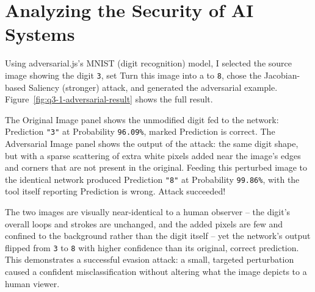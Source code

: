 \section{Analyzing the Security of AI Systems}


\dranswer

Using adversarial.js's MNIST (digit recognition) model, I selected the source image showing the digit \texttt{3}, set \textquotedbl{}Turn this image into a\textquotedbl{} to \texttt{8}, chose the \textquotedbl{}Jacobian-based Saliency (stronger)\textquotedbl{} attack, and generated the adversarial example. Figure~\ref{fig:q3-1-adversarial-result} shows the full result.

The Original Image panel shows the unmodified digit fed to the network: Prediction \texttt{"3"} at Probability \texttt{96.09\%}, marked \textquotedbl{}Prediction is correct.\textquotedbl{} The Adversarial Image panel shows the output of the attack: the same digit shape, but with a sparse scattering of extra white pixels added near the image's edges and corners that are not present in the original. Feeding this perturbed image to the identical network produced Prediction \texttt{"8"} at Probability \texttt{99.86\%}, with the tool itself reporting \textquotedbl{}Prediction is wrong. Attack succeeded!\textquotedbl{}


The two images are visually near-identical to a human observer -- the digit's overall loops and strokes are unchanged, and the added pixels are few and confined to the background rather than the digit itself -- yet the network's output flipped from \texttt{3} to \texttt{8} with higher confidence than its original, correct prediction. This demonstrates a successful evasion attack: a small, targeted perturbation caused a confident misclassification without altering what the image depicts to a human viewer.


\dranswer

